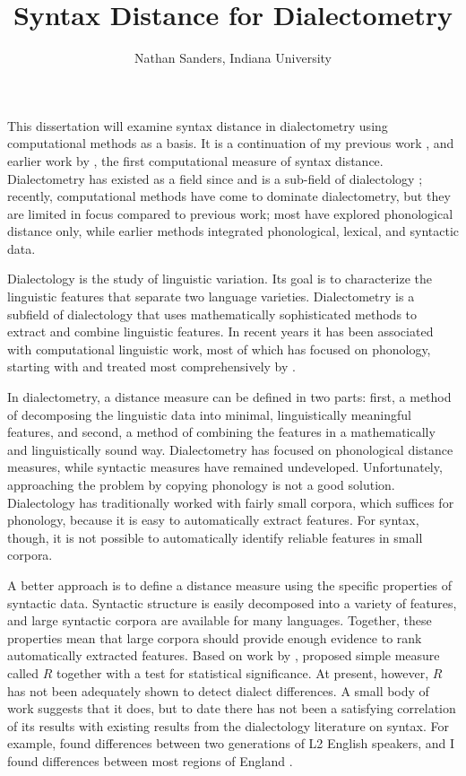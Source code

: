 \documentclass[11pt,letterpaper]{article}
\author{Nathan Sanders, Indiana University}
\title{Syntax Distance for Dialectometry}
\begin{document}
\maketitle

This dissertation will examine syntax distance in dialectometry using
computational methods as a basis. It is a continuation of my previous
work \cite{sanders07}, \cite{sanders08b} and earlier work by
, the first computational measure of syntax
distance. Dialectometry has existed as a field since
 and is a sub-field of dialectology
\cite{chambers98}; recently, computational methods have come to
dominate dialectometry, but they are limited in focus compared to
previous work; most have explored phonological distance only, while
earlier methods integrated phonological, lexical, and syntactic data.

Dialectology is the study of linguistic variation.
Its goal is to characterize the linguistic features that separate two
language varieties. Dialectometry is a subfield of dialectology that
uses mathematically sophisticated methods to extract and combine
linguistic features. In recent years it has been associated with
computational linguistic work, most of which has focused on
phonology, starting with  and treated most
comprehensively by .

In dialectometry, a distance measure can be defined in two parts:
first, a method of decomposing the linguistic data into minimal,
linguistically meaningful features, and second, a method of combining
the features in a mathematically and linguistically sound way.
Dialectometry has focused on phonological distance measures, while
syntactic measures have remained undeveloped. Unfortunately,
approaching the problem by copying phonology is not a good solution.
Dialectology has traditionally worked with fairly small
corpora, which suffices for phonology, because it is easy to
automatically extract features. For syntax, though, it is not possible to
automatically identify reliable features in small corpora.

A better approach is to define a distance measure using the specific
properties of syntactic data. Syntactic structure is easily decomposed
into a variety of features, and large syntactic corpora are available
for many languages. Together, these properties mean that large corpora
should provide enough evidence to rank automatically extracted
features. Based on work by , 
proposed simple measure called $R$ together with a test for
statistical significance. At present, however, $R$ has not been
adequately shown to detect dialect differences. A small body of work
suggests that it does, but to date there has not been a satisfying
correlation of its results with existing results from the dialectology
literature on syntax. For example,  found
differences between two generations of L2 English speakers, and I
found differences between most regions of England \cite{sanders08b}.
\end{document}

